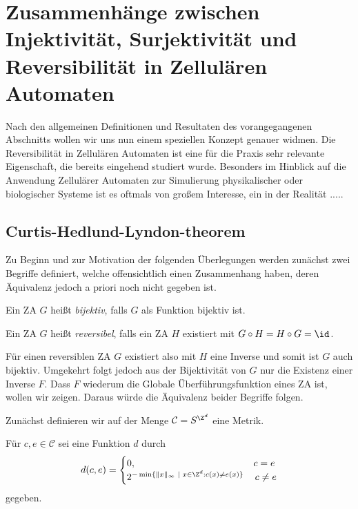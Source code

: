 \section{Zusammenhänge zwischen Injektivität, Surjektivität und Reversibilität in Zellulären Automaten}
\label{section:results}

Nach den allgemeinen Definitionen und Resultaten des vorangegangenen Abschnitts wollen wir uns nun einem speziellen Konzept genauer widmen. Die Reversibilität in Zellulären Automaten ist eine für die Praxis sehr relevante Eigenschaft, die bereits eingehend studiert wurde. Besonders im Hinblick auf die Anwendung Zellulärer Automaten zur Simulierung physikalischer oder biologischer Systeme ist es oftmals von großem Interesse, ein in der Realität .....

\subsection{Curtis-Hedlund-Lyndon-theorem}
\label{section:hedlund}

Zu Beginn und zur Motivation der folgenden Überlegungen werden zunächst zwei Begriffe definiert, welche offensichtlich einen Zusammenhang haben, deren Äquivalenz jedoch a priori noch nicht gegeben ist.

\begin{definition}
  Ein ZA $G$ heißt \textit{bijektiv}, falls $G$ als Funktion bijektiv ist.

  Ein ZA $G$ heißt \textit{reversibel}, falls ein ZA $H$ existiert mit $G \circ H = H \circ G = \id$.
\end{definition}

Für einen reversiblen ZA $G$ existiert also mit $H$ eine Inverse und somit ist $G$ auch bijektiv. Umgekehrt folgt jedoch aus der Bijektivität von $G$ nur die Existenz einer Inverse $F$. Dass $F$ wiederum die Globale Überführungsfunktion eines ZA ist, wollen wir zeigen. Daraus würde die Äquivalenz beider Begriffe folgen.

Zunächst definieren wir auf der Menge $\mathcal{C} = S^{\Z^d}$ eine Metrik.

\begin{definition}\label{definition:metricdef}
  Für $c,e \in \mathcal{C}$ sei eine Funktion $d$ durch
  \begin{align*}
    d(c, e) = \begin{cases}
      0, & c = e \\
      2^{- \min \{ \|x\|_\infty \text{~}|\text{~} x \in \Z^d: c(x) \neq e(x)\} }& \, c \neq e
    \end{cases}
  \end{align*}
  gegeben.
\end{definition}

